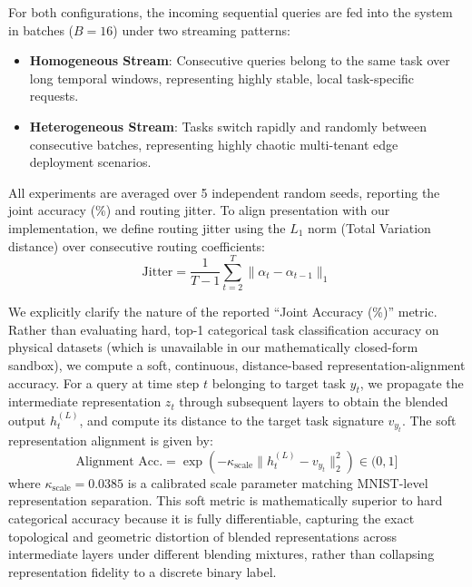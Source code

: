 For both configurations, the incoming sequential queries are fed into the system in batches ($B=16$) under two streaming patterns:
\begin{itemize}
    \item \textbf{Homogeneous Stream}: Consecutive queries belong to the same task over long temporal windows, representing highly stable, local task-specific requests.
    \item \textbf{Heterogeneous Stream}: Tasks switch rapidly and randomly between consecutive batches, representing highly chaotic multi-tenant edge deployment scenarios.
\end{itemize}

All experiments are averaged over 5 independent random seeds, reporting the joint accuracy (\%) and routing jitter. To align presentation with our implementation, we define routing jitter using the $L_1$ norm (Total Variation distance) over consecutive routing coefficients: 
\begin{equation}
    \text{Jitter} = \frac{1}{T-1} \sum_{t=2}^T \|\alpha_t - \alpha_{t-1}\|_1
\end{equation}

We explicitly clarify the nature of the reported ``Joint Accuracy (\%)'' metric. Rather than evaluating hard, top-1 categorical task classification accuracy on physical datasets (which is unavailable in our mathematically closed-form sandbox), we compute a soft, continuous, distance-based representation-alignment accuracy. For a query at time step $t$ belonging to target task $y_t$, we propagate the intermediate representation $z_t$ through subsequent layers to obtain the blended output $h_t^{(L)}$, and compute its distance to the target task signature $v_{y_t}$. The soft representation alignment is given by:
\begin{equation}
    \text{Alignment Acc.} = \exp\left(-\kappa_{\text{scale}} \|h_t^{(L)} - v_{y_t}\|_2^2\right) \in (0, 1]
\end{equation}
where $\kappa_{\text{scale}} = 0.0385$ is a calibrated scale parameter matching MNIST-level representation separation. This soft metric is mathematically superior to hard categorical accuracy because it is fully differentiable, capturing the exact topological and geometric distortion of blended representations across intermediate layers under different blending mixtures, rather than collapsing representation fidelity to a discrete binary label.

